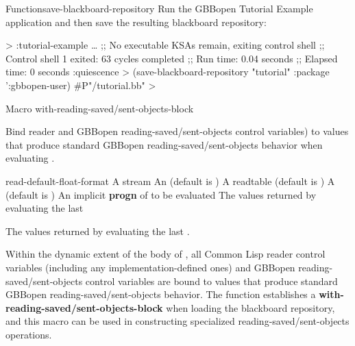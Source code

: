\documentclass[10pt,twoside,english,pdftex]{article}
\begin{document}
\begin{functiondoc}{Function}{save-blackboard-repository}
\fnexample Run the GBBopen Tutorial Example application and then save the
resulting blackboard repository:
%
\W\supp
\begin{example}
  > :tutorial-example
      \textrm{\ldots{}}
  ;; No executable KSAs remain, exiting control shell
  ;; Control shell 1 exited: 63 cycles completed
  ;; Run time: 0.04 seconds
  ;; Elapsed time: 0 seconds
  :quiescence
  > (save-blackboard-repository "tutorial" :package ':gbbopen-user)
  #P"/tutorial.bb"
  >
\end{example}

\end{functiondoc}


\begin{functiondoc}{Macro}%
  {with-reading-saved/sent-objects-block}%
  {\code{(} 
     \code{)}
    \superstar
    \returns{} \superstar}
  
\fnsyntax

\fnpurpose Bind reader and GBBopen reading-saved/sent-objects control
variables) to values that produce standard GBBopen
reading-saved/sent-objects behavior when evaluating .

\fnpackage {}

\fnmodule {}

\fnargs
\begin{args}{read-default-float-format}
\arg[stream] A stream
 An  (default is \nil)
\arg[readtable] A readtable (default is 
  )
 A  (default is \nil)
\arg[forms] An implicit \textbf{progn} of  to be evaluated
\arg[results] The values returned by evaluating the last 
\end{args}

\fnreturns The values returned by evaluating the last .

\fndescription Within the dynamic extent of the body of ,
all Common Lisp reader control variables (including any
implementation-defined ones) and GBBopen reading-saved/sent-objects
control variables are bound to values that produce standard GBBopen
reading-saved/sent-objects behavior.  The function
\textbf{} establishes a
\textbf{with-reading-saved/sent-objects-block} when loading the
blackboard repository, and this macro can be used in constructing
specialized reading-saved/sent-objects operations.


\end{functiondoc}
\end{document}
